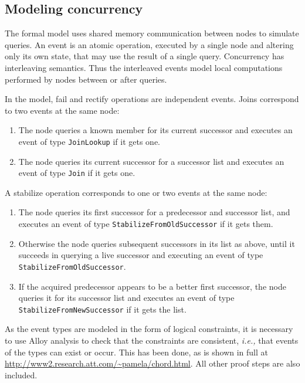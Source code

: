\documentclass[conference]{IEEEtran}
\begin{document}
\subsection{Modeling concurrency}
\label{sec:concurrency}

The formal model uses shared memory communication between nodes to
simulate queries.
An event is an atomic operation, executed by a single node and
altering only its own state, that may use the result of a single
query.
Concurrency has interleaving semantics.
Thus the interleaved events model local 
computations performed by
nodes between or after queries.

In the model, fail and rectify operations are independent events.
Joins correspond to two events at the same node:
\begin{enumerate}
\item
The node queries a known member for its current successor and
executes an event of type
\small
{\tt JoinLookup}
\normalsize
if it gets one.
\item
The node queries its current successor for a successor list
and executes an event of type
\small
{\tt Join}
\normalsize
if it gets one.
\end{enumerate}
A stabilize operation corresponds to one or two events at the 
same node:
\begin{enumerate}
\item
The node queries its first successor for a predecessor and successor
list, and executes an event of type
\small
{\tt StabilizeFromOldSuccessor}
\normalsize
if it gets them.
\item
Otherwise the node queries subsequent successors in its list as
above, until it succeeds in querying a live successor and
executing an event of type
\small
{\tt StabilizeFromOldSuccessor}.
\normalsize
\item
If the acquired predecessor appears to be a better first successor,
the node queries it for its successor list and executes an event of type
\small
{\tt StabilizeFromNewSuccessor}
\normalsize
if it gets the list.
\end{enumerate}

As the event types are modeled in the form of logical constraints, it is
necessary to use Alloy analysis to check that the constraints are
consistent, {\it i.e.,} that events of the types can exist or occur.
This has been done, as is shown in full at
\url{http://www2.research.att.com/~pamela/chord.html}.
All other proof steps are also included.
\end{document}
